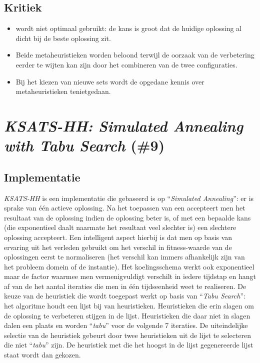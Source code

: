 \subsection{Kritiek}
\begin{itemize}
 \item \abco[C]{} wordt niet optimaal gebruikt: de kans is groot dat de huidige oplossing al dicht bij de beste oplossing zit.
 \item Beide metaheuristieken worden beloond terwijl de oorzaak van de verbetering eerder te wijten kan zijn door het combineren van de twee configuraties.
 \item Bij het kiezen van nieuwe sets wordt de opgedane kennis over metaheuristieken tenietgedaan.
\end{itemize}
\section{\emph{KSATS-HH: Simulated Annealing with Tabu Search} (\#9)}
\label{sss:ksats-hh}
\subsection{Implementatie}
\emph{KSATS-HH}\cite{chesc-ksats-hh} is een implementatie die gebaseerd is op ``\emph{Simulated Annealing}''\cite{citeulike:1612433}: er is sprake van \'e\'en actieve oplossing. Na het toepassen van een \abllh{} accepteert men het resultaat van de oplossing indien de oplossing beter is, of met een bepaalde kans (die exponentieel daalt naarmate het resultaat veel slechter is) een slechtere oplossing accepteert. Een intelligent aspect hierbij is dat men op basis van ervaring uit het verleden gebruikt om het verschil in fitness-waarde van de oplossingen eerst te normaliseren (het verschil kan immers afhankelijk zijn van het probleem domein of de instantie). Het koelingsschema werkt ook exponentieel maar de factor waarmee men vermenigvuldigt verschilt in iedere tijdstap en hangt af van de het aantal iteraties die men in \'e\'en tijdseenheid weet te realiseren. De keuze van de heuristiek die wordt toegepast werkt op basis van ``\emph{Tabu Search}''\cite{DBLP:journals/informs/Glover89}: het algoritme houdt een lijst bij van heuristieken. Heuristieken die erin slagen om de oplossing te verbeteren stijgen in de lijst. Heuristieken die daar niet in slagen dalen een plaats en worden ``\emph{tabu}'' voor de volgende 7 iteraties. De uiteindelijke selectie van de heuristiek gebeurt door twee heuristieken uit de lijst te selecteren die niet ``\emph{tabu}'' zijn. De heuristiek met die het hoogst in de lijst gegenereerde lijst staat wordt dan gekozen.
